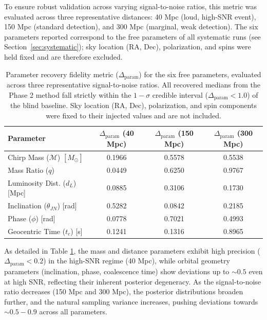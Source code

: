 \documentclass[12pt]{article}
\begin{document}
To ensure robust validation across varying signal-to-noise ratios, this metric was evaluated across three representative distances: 40 Mpc (loud, high-SNR event), 150 Mpc (standard detection), and 300 Mpc (marginal, weak detection). The six parameters reported correspond to the free parameters of all systematic runs (see Section~\ref{sec:systematic}); sky location (RA, Dec), polarization, and spins were held fixed and are therefore excluded.

\begin{table}[htbp]
    \centering
    \begin{tabular}{l c c c}
        \hline\hline
        \textbf{Parameter} & \textbf{$\Delta_{\text{param}}$ (40 Mpc)} & \textbf{$\Delta_{\text{param}}$ (150 Mpc)} & \textbf{$\Delta_{\text{param}}$ (300 Mpc)} \\
        \hline
        Chirp Mass ($\mathcal{M}$) $[M_{\odot}]$        & 0.1966 & 0.5578 & 0.5538 \\
        Mass Ratio ($q$)                                  & 0.0449 & 0.6250 & 0.9767 \\
        Luminosity Dist. ($d_L$) [Mpc]                   & 0.0885 & 0.3106 & 0.1730 \\
        Inclination ($\theta_{JN}$) [rad]                 & 0.5282 & 0.0842 & 0.2185 \\
        Phase ($\phi$) [rad]                              & 0.0778 & 0.7021 & 0.4993 \\
        Geocentric Time ($t_c$) [s]                       & 0.1241 & 0.1316 & 0.8965 \\
        \hline\hline
    \end{tabular}
    \caption[Parameter recovery fidelity $\Delta_{\mathrm{param}}$ at three SNRs.]{Parameter recovery fidelity metric ($\Delta_{\text{param}}$) for the six free parameters, evaluated across three representative signal-to-noise ratios. All recovered medians from the Phase 2 method fall strictly within the $1-\sigma$ credible interval ($\Delta_{\text{param}} < 1.0$) of the blind baseline. Sky location (RA, Dec), polarization, and spin components were fixed to their injected values and are not included.}
    \label{tab:parameter_fidelity_multi}
\end{table}

As detailed in Table \ref{tab:parameter_fidelity_multi}, the mass and distance parameters exhibit high precision ($\Delta_{\text{param}} < 0.2$) in the high-SNR regime (40 Mpc), while orbital geometry parameters (inclination, phase, coalescence time) show deviations up to $\sim 0.5$ even at high SNR, reflecting their inherent posterior degeneracy. As the signal-to-noise ratio decreases (150 Mpc and 300 Mpc), the posterior distributions broaden further, and the natural sampling variance increases, pushing deviations towards $\sim 0.5 - 0.9$ across all parameters.
\end{document}
